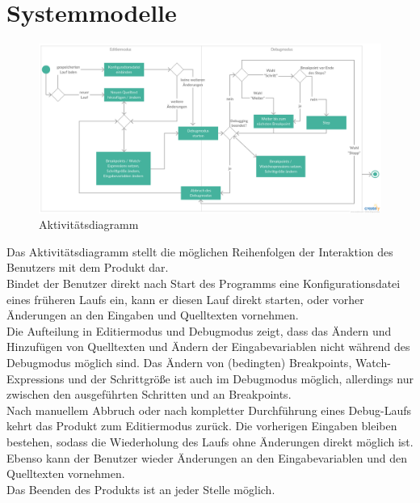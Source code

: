 \documentclass[parskip=full]{scrartcl}
\begin{document}
\section{Systemmodelle}
\begin{figure}[h] 
  \centering
     \includegraphics[width=1.0\textwidth]{Aktivitaetsdiagramm}
  \caption{Aktivitätsdiagramm}
  \label{fig:Bild2}
\end{figure}
\vspace{0.7cm}
Das Aktivitätsdiagramm stellt die möglichen Reihenfolgen der Interaktion des Benutzers mit dem Produkt dar. \\
Bindet der Benutzer direkt nach Start des Programms eine \gls{Konfigurationsdatei} eines früheren Laufs ein, kann er diesen Lauf direkt starten, oder vorher Änderungen an den Eingaben und Quelltexten vornehmen. \\
Die Aufteilung in \gls{Editiermodus} und \gls{Debugmodus} zeigt, dass das Ändern und Hinzufügen von Quelltexten und Ändern der Eingabevariablen nicht während des \gls{Debugmodus} möglich sind. Das Ändern von (bedingten) \glspl{Breakpoint}, \glspl{Watch-Expression} und der Schrittgröße ist auch im Debugmodus möglich, allerdings nur zwischen den ausgeführten Schritten und an \glspl{Breakpoint}. \\
Nach manuellem Abbruch oder nach kompletter Durchführung eines Debug-Laufs kehrt das Produkt zum \gls{Editiermodus} zurück. Die vorherigen Eingaben bleiben bestehen, sodass die Wiederholung des Laufs ohne Änderungen direkt möglich ist. Ebenso kann der Benutzer wieder Änderungen an den Eingabevariablen und den Quelltexten vornehmen.\\
Das Beenden des Produkts ist an jeder Stelle möglich.

\newpage
\end{document}
